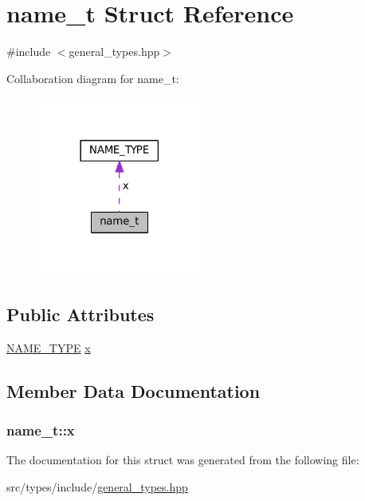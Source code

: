\hypertarget{structname__t}{}\section{name\+\_\+t Struct Reference}
\label{structname__t}


{\ttfamily \#include $<$general\+\_\+types.\+hpp$>$}



Collaboration diagram for name\+\_\+t\+:
\nopagebreak
\begin{figure}[H]
\begin{center}
\leavevmode
\includegraphics[width=153pt]{structname__t__coll__graph}
\end{center}
\end{figure}
\subsection*{Public Attributes}
\begin{DoxyCompactItemize}
\item 
\hyperlink{structNAME__TYPE}{N\+A\+M\+E\+\_\+\+T\+Y\+PE} \hyperlink{structname__t_aeef167ae3c011b675cd10f9e440ba4ff}{x}
\end{DoxyCompactItemize}


\subsection{Member Data Documentation}
\subsubsection[{\texorpdfstring{x}{x}}]{ name\+\_\+t\+::x}\hypertarget{structname__t_aeef167ae3c011b675cd10f9e440ba4ff}{}\label{structname__t_aeef167ae3c011b675cd10f9e440ba4ff}


The documentation for this struct was generated from the following file\+:\begin{DoxyCompactItemize}
\item 
src/types/include/\hyperlink{general__types_8hpp}{general\+\_\+types.\+hpp}\end{DoxyCompactItemize}
